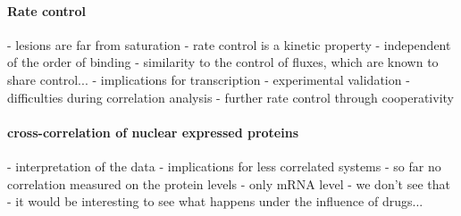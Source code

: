 \paragraph{Rate control}
- lesions are far from saturation 
- rate control is a kinetic property - independent of the order of binding
- similarity to the control of fluxes, which are known to share control...
- implications for transcription 
- experimental validation
- difficulties during correlation analysis
- further rate control through cooperativity 


\paragraph{cross-correlation of nuclear expressed proteins}
- interpretation of the data
- implications for less correlated systems
- so far no correlation measured on the protein levels 
- only mRNA level - we don't see that
- it would be interesting to see what happens under the influence of drugs...


